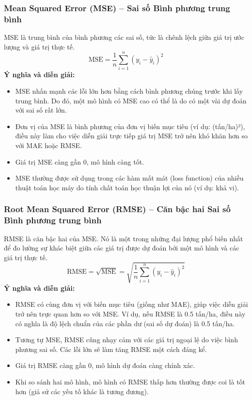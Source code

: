 \subsubsection{Mean Squared Error (MSE) – Sai số Bình phương trung bình}
\label{subsubsec:mse_explanation}
MSE là trung bình của bình phương các sai số, tức là chênh lệch giữa giá trị ước lượng và giá trị thực tế.
\begin{equation}
    \text{MSE} = \frac{1}{n} \sum_{i=1}^{n} (y_i - \hat{y}_i)^2
    \label{eq:mse}
\end{equation}
\textbf{Ý nghĩa và diễn giải:}
\begin{itemize}
    \item MSE nhấn mạnh các lỗi lớn hơn bằng cách bình phương chúng trước khi lấy trung bình. Do đó, một mô hình có MSE cao có thể là do có một vài dự đoán với sai số rất lớn.
    \item Đơn vị của MSE là bình phương của đơn vị biến mục tiêu (ví dụ: (tấn/ha)²), điều này làm cho việc diễn giải trực tiếp giá trị MSE trở nên khó khăn hơn so với MAE hoặc RMSE.
    \item Giá trị MSE càng gần 0, mô hình càng tốt.
    \item MSE thường được sử dụng trong các hàm mất mát (loss function) của nhiều thuật toán học máy do tính chất toán học thuận lợi của nó (ví dụ: khả vi).
\end{itemize}

\subsubsection{Root Mean Squared Error (RMSE) – Căn bậc hai Sai số Bình phương trung bình}
\label{subsubsec:rmse_explanation}
RMSE là căn bậc hai của MSE. Nó là một trong những đại lượng phổ biến nhất để đo lường sự khác biệt giữa các giá trị được dự đoán bởi một mô hình và các giá trị thực tế.
\begin{equation}
    \text{RMSE} = \sqrt{\text{MSE}} = \sqrt{\frac{1}{n} \sum_{i=1}^{n} (y_i - \hat{y}_i)^2}
    \label{eq:rmse}
\end{equation}
\textbf{Ý nghĩa và diễn giải:}
\begin{itemize}
    \item RMSE có cùng đơn vị với biến mục tiêu (giống như MAE), giúp việc diễn giải trở nên trực quan hơn so với MSE. Ví dụ, nếu RMSE là 0.5 tấn/ha, điều này có nghĩa là độ lệch chuẩn của các phần dư (sai số dự đoán) là 0.5 tấn/ha.
    \item Tương tự MSE, RMSE cũng nhạy cảm với các giá trị ngoại lệ do việc bình phương sai số. Các lỗi lớn sẽ làm tăng RMSE một cách đáng kể.
    \item Giá trị RMSE càng gần 0, mô hình dự đoán càng chính xác.
    \item Khi so sánh hai mô hình, mô hình có RMSE thấp hơn thường được coi là tốt hơn (giả sử các yếu tố khác là tương đương).
\end{itemize}

